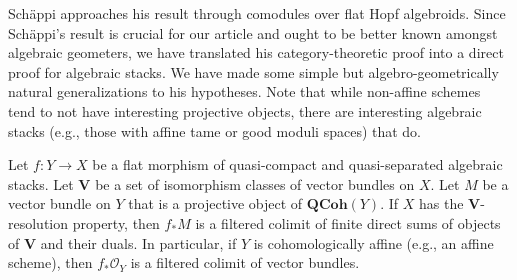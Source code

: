 \documentclass[reqno,a4paper]{amsart}
\numberwithin{Theorem}{section}
\newcommand{\Orb}{\mathcal{O}}
\newcommand{\Vect}{\mathbf{V}}
\newcommand{\QCoh}{\mathbf{QCoh}}
\theoremstyle{plain}
\theoremstyle{remark}
\begin{document}
Sch\"appi approaches his result through comodules over flat Hopf
algebroids. Since Sch\"appi's result is crucial for our article and
ought to be better known amongst algebraic geometers, we have
translated his category-theoretic proof into a direct proof for
algebraic stacks. We have made some simple but algebro-geometrically
natural generalizations to his hypotheses. Note that while non-affine
schemes tend to not have interesting projective objects, there are
interesting algebraic stacks (e.g., those with affine tame
\cite{MR2427954} or good \cite{2008arXiv0804.2242A} moduli spaces)
that do.
\begin{Theorem}\label{T:schappi}
  Let ${f \colon Y \to X}$ be a flat morphism of quasi-compact and quasi-separated algebraic stacks. Let
  $\Vect$ be a set of isomorphism classes of vector bundles on $X$. Let $M$ be a vector
  bundle on $Y$ that is a projective object of $\QCoh(Y)$. If $X$ has the $\Vect$-resolution property, then $f_*M$ is a
  filtered colimit of finite direct sums of objects of
  $\Vect$ and their duals. In particular, if $Y$ is cohomologically affine
   (e.g., an affine scheme), then $f_*\Orb_Y$ is a
  filtered colimit of vector bundles.
\end{Theorem}
\end{document}
